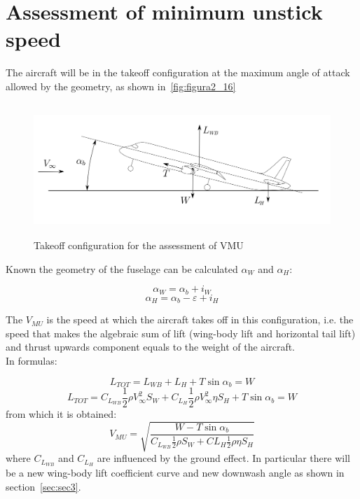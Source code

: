 
\section{Assessment of minimum unstick speed}
The aircraft will be in the takeoff configuration at the maximum angle of attack allowed by the geometry, as shown in~\vref{fig:figura2_16}
\begin{figure}[H]
	\centering
	\includegraphics[height=5cm, keepaspectratio ]{Immagini/Capitolo2/2_16-aereoVmu} 
	\caption{Takeoff configuration for the assessment of VMU} %
	\label{fig:figura2_16} %
\end{figure}

Known the geometry of the fuselage can be calculated $\alpha_{W}$ and $\alpha_{H}$:

\[\alpha_{W}=\alpha_{b}+i_W\]
\[\alpha_{H}=\alpha_{b}-\varepsilon+i_H\]

The $V_{MU}$  is the speed at which the aircraft takes off in this configuration, i.e. the speed that makes the 
algebraic sum of lift (wing-body lift and horizontal tail lift) and thrust upwards component equals to the weight of the aircraft.\\
In formulas:

\begin{equation}
L_{TOT}=L_{WB}+L_H+T\sin \alpha_b=W
\label{eq:equazione2_5} %
\end{equation}
\begin{equation}
L_{TOT}=C_{L_{WB}}\frac{1}{2}\rho V_{\infty}^2S_W+C_{L_{H}}\frac{1}{2}\rho V_{\infty}^2 \eta S_H+T\sin \alpha_b=W
\label{eq:equazione2_6} %
\end{equation}
from which it is obtained:
\begin{equation}
V_{MU}=\sqrt{\frac{W-T\sin \alpha_b}{C_{L_{WB}}\frac{1}{2}\rho S_W+C{L_H}\frac{1}{2}\rho  \eta S_H}}
\label{eq:equazione2_6} %
\end{equation}
where $C_{L_{WB}}$ and $C_{L_H}$  are influenced by the ground effect. In particular there will be a new wing-body lift coefficient curve and new downwash angle as shown in section~\ref{sec:sec3}.
